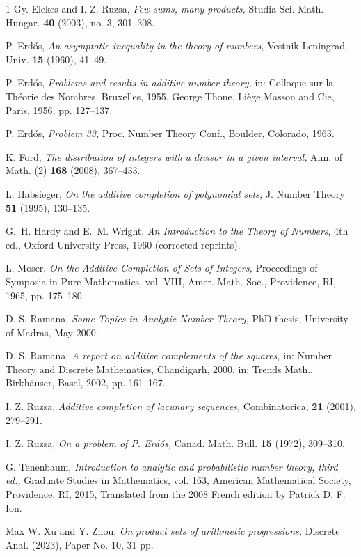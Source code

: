 \documentclass[12pt,a4paper,reqno]{amsart}
\numberwithin{equation}{section}
\theoremstyle{plain}
\theoremstyle{definition}
\begin{document}
\begin{thebibliography}{1}
Gy. Elekes and I. Z. Ruzsa, {\it Few sums, many products,} Studia Sci. Math. Hungar. {\bf40} (2003), no. 3,
301--308. 

P. Erd\H os, {\it An asymptotic inequality in the theory of numbers,} Vestnik Leningrad. Univ. {\bf15} (1960), 41--49.


P. Erd\H os, {\it Problems and results in additive number theory,} in: Colloque sur la Th\'eorie des Nombres, Bruxelles, 1955, George Thone, Li\`ege Masson and Cie, Paris, 1956, pp. 127--137.



P. Erd\H os, {\it Problem 33,} Proc. Number Theory Conf., Boulder, Colorado, 1963.

K. Ford, {\it The distribution of integers with a divisor in a given interval,} Ann. of Math. (2) {\bf 168} (2008), 367--433. 

L. Habsieger, {\it On the additive completion of polynomial sets,} J. Number Theory {\bf51} (1995), 130--135.

G.~H. Hardy and E.~M. Wright,
\emph{An Introduction to the Theory of Numbers},
4th ed., Oxford University Press, 1960 (corrected reprints).

L. Moser, {\it On the Additive Completion of Sets of Integers,} Proceedings of Symposia in Pure Mathematics, vol. VIII, Amer. Math. Soc., Providence, RI, 1965, pp. 175--180.

D. S. Ramana, {\it Some Topics in Analytic Number Theory,} PhD thesis, University of Madras, May 2000.

D. S. Ramana, {\it A report on additive complements of the squares,} in: Number Theory and Discrete Mathematics, Chandigarh, 2000, in: Trends Math., Birkh\"auser, Basel, 2002, pp. 161--167.

I. Z. Ruzsa, {\it Additive completion of lacunary sequences,} Combinatorica, {\bf21} (2001), 279--291.

I. Z. Ruzsa, {\it On a problem of P. Erd\H os,} Canad. Math. Bull. {\bf15} (1972), 309--310.

G. Tenenbaum, {\it Introduction to analytic and probabilistic number theory, third ed.,} Graduate Studies in
Mathematics, vol. 163, American Mathematical Society, Providence, RI, 2015, Translated from the
2008 French edition by Patrick D. F. Ion.

Max W. Xu and Y. Zhou, {\it On product sets of arithmetic progressions,} Discrete Anal. (2023), Paper No. 10, 31 pp.  

\end{thebibliography}
\end{document}
